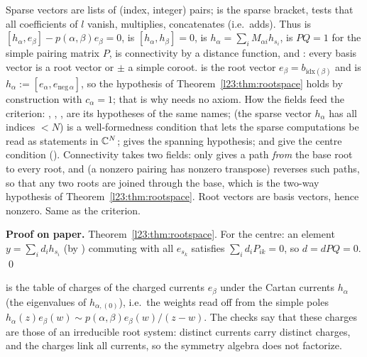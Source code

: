 \begin{dictionary}
Sparse vectors are lists of (index, integer) pairs;  is the sparse bracket,  tests that all coefficients of $l$
vanish,  multiplies, \lean{++} concatenates (i.e.\ adds). Thus  is $[h_\alpha,e_\beta]-p(\alpha,\beta)e_\beta=0$,
 is $[h_\alpha,h_\beta]=0$,  is $h_\alpha=\sum_iM_{\alpha i}h_{s_i}$,  is $PQ=1$ for the simple pairing matrix $P$,
 is connectivity by a distance function, and : every basis vector is a root vector or $\pm$ a simple coroot.
 is the root vector $e_\beta=b_{\mathrm{idx}(\beta)}$ and  is $h_\alpha:=[e_\alpha,e_{\mathrm{neg}\,\alpha}]$, so the
hypothesis  of Theorem~\ref{l23:thm:rootspace} holds by construction with $c_\alpha=1$; that is why  needs no axiom.
How the fields feed the criterion: , , ,  are its hypotheses of the same names;
 (the sparse vector $h_\alpha$ has all indices $<N$) is a well-formedness condition that lets the sparse computations be
read as statements in ${\mathbb{C}}^N$;  gives the spanning hypothesis;  and  give the centre condition
(). Connectivity takes two fields:  only gives a path \emph{from} the base root
 to every root, and  (a nonzero pairing has nonzero transpose) reverses such paths, so that any two roots are joined
through the base, which is the two-way  hypothesis  of Theorem~\ref{l23:thm:rootspace}. Root vectors
are basis vectors, hence nonzero. Same as the criterion.
\end{dictionary}

\textbf{Proof on paper.} Theorem~\ref{l23:thm:rootspace}. For the centre: an element $y=\sum_id_ih_{s_i}$ (by ) commuting with all
$e_{s_k}$ satisfies $\sum_id_iP_{ik}=0$, so $d=dPQ=0$. \qed

\begin{physics}
 is the table of charges of the charged currents $e_\beta$ under the Cartan currents $h_\alpha$ (the eigenvalues of
$h_{\alpha,(0)}$), i.e.\ the weights read off from the simple poles $h_\alpha(z)e_\beta(w)\sim p(\alpha,\beta)e_\beta(w)/(z-w)$. The checks say
that these charges are those of an irreducible root system: distinct currents carry distinct charges, and the charges link all
currents, so the symmetry algebra does not factorize.
\end{physics}

